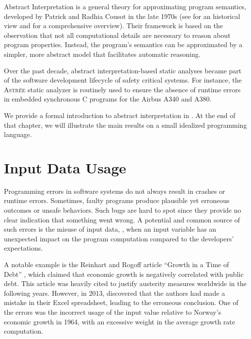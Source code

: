 Abstract Interpretation  is a general theory for approximating program semantics, developed by Patrick and Radhia Cousot in the late 1970s (see  for an historical view and  for a comprehensive overview).
Their framework is based on the observation that not all computational details are necessary to reason about program properties.
Instead, the program's semantics can be approximated by a simpler, more abstract model that facilitates automatic reasoning.

Over the past decade, abstract interpretation-based static analyses became part of the software development lifecycle of safety critical systems.
For instance, the \textsc{Astrée} static analyzer  is routinely used to ensure the absence of runtime errors in embedded synchronous C programs for the Airbus A340 and A380.

We provide a formal introduction to abstract interpretation in .
At the end of that chapter, we will illustrate the main results on a small idealized programming language.

\section{Input Data Usage}

Programming errors in software systems do not always result in crashes or runtime errors.
Sometimes, faulty programs produce plausible yet erroneous outcomes or unsafe behaviors.
Such bugs are hard to spot since they provide no clear indication that something went wrong.
A potential and common source of such errors is the misuse of input data, \ie, when an input variable has an unexpected impact on the program computation compared to the developers' expectations.

A notable example is the Reinhart and Rogoff article “Growth in a Time of Debt” , which claimed that economic growth is negatively correlated with public debt.
This article was heavily cited to justify austerity measures worldwide in the following years.
However, in 2013,  discovered that the authors had made a mistake in their Excel spreadsheet, leading to the erroneous conclusion.
One of the errors was the incorrect usage of the input value relative to Norway's economic growth in 1964, with an excessive weight in the average growth rate computation.

